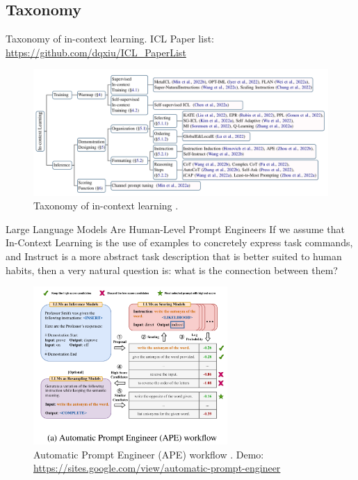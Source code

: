\documentclass[aspectratio=1610,xcolor={dvipsnames},hyperref={colorlinks,unicode,linkcolor=violet,anchorcolor=BlueViolet,citecolor=YellowOrange,filecolor=black,urlcolor=Aquamarine}]{beamer}
\begin{document}
\subsection{Taxonomy}
\label{sec:orgf70e7a9}

\begin{frame}[label={sec:org4068af3}]{Taxonomy of in-context learning.}
ICL Paper list: \url{https://github.com/dqxiu/ICL\_PaperList}

\begin{figure}[htbp]
\centering
\includegraphics[width=.9\linewidth]{./p1.png}
\caption{\label{fig:org92c327c}Taxonomy of in-context learning .}
\end{figure}
\end{frame}

\begin{frame}[label={sec:org20c7918}]{Large Language Models Are Human-Level Prompt Engineers}
\tiny If we assume that In-Context Learning is the use of examples to concretely express task commands, and Instruct is a more abstract task description that is better suited to human habits, then a very natural question is: what is the connection between them?

\begin{figure}[htbp]
\centering
\includegraphics[height=6cm]{./p9.png}
\caption{\label{fig:org00e32be}\tiny Automatic Prompt Engineer (APE) workflow . Demo: \url{https://sites.google.com/view/automatic-prompt-engineer}}
\end{figure}
\end{frame}
\end{document}

